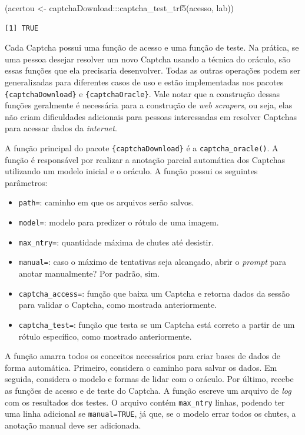 \documentclass[12pt,twoside,brazilian]{book}
\newenvironment{Shaded}{\begin{snugshade}}{\end{snugshade}}
\newcommand{\FunctionTok}[1]{\textcolor[rgb]{0.28,0.35,0.67}{#1}}
\newcommand{\NormalTok}[1]{\textcolor[rgb]{0.00,0.23,0.31}{#1}}
\newcommand{\OtherTok}[1]{\textcolor[rgb]{0.00,0.23,0.31}{#1}}
\newcommand{\SpecialCharTok}[1]{\textcolor[rgb]{0.37,0.37,0.37}{#1}}
\providecommand{\tightlist}{%
  \setlength{\itemsep}{0pt}\setlength{\parskip}{0pt}}
\begin{document}
\begin{Shaded}
\begin{Highlighting}[]
\NormalTok{(acertou }\OtherTok{\textless{}{-}}\NormalTok{ captchaDownload}\SpecialCharTok{:::}\FunctionTok{captcha\_test\_trf5}\NormalTok{(acesso, lab))}
\end{Highlighting}
\end{Shaded}

\begin{verbatim}
[1] TRUE
\end{verbatim}

Cada Captcha possui uma função de acesso e uma função de teste. Na
prática, se uma pessoa desejar resolver um novo Captcha usando a técnica
do oráculo, são essas funções que ela precisaria desenvolver. Todas as
outras operações podem ser generalizadas para diferentes casos de uso e
estão implementadas nos pacotes \texttt{\{captchaDownload\}} e
\texttt{\{captchaOracle\}}. Vale notar que a construção dessas funções
geralmente é necessária para a construção de \emph{web scrapers}, ou
seja, elas não criam dificuldades adicionais para pessoas interessadas
em resolver Captchas para acessar dados da \emph{internet}.

A função principal do pacote \texttt{\{captchaDownload\}} é a
\texttt{captcha\_oracle()}. A função é responsável por realizar a
anotação parcial automática dos Captchas utilizando um modelo inicial e
o oráculo. A função possui os seguintes parâmetros:

\begin{itemize}
\tightlist
\item
  \texttt{path=}: caminho em que os arquivos serão salvos.
\item
  \texttt{model=}: modelo para predizer o rótulo de uma imagem.
\item
  \texttt{max\_ntry=}: quantidade máxima de chutes até desistir.
\item
  \texttt{manual=}: caso o máximo de tentativas seja alcançado, abrir o
  \emph{prompt} para anotar manualmente? Por padrão, sim.
\item
  \texttt{captcha\_access=}: função que baixa um Captcha e retorna dados
  da sessão para validar o Captcha, como mostrada anteriormente.
\item
  \texttt{captcha\_test=}: função que testa se um Captcha está correto a
  partir de um rótulo específico, como mostrado anteriormente.
\end{itemize}

A função amarra todos os conceitos necessários para criar bases de dados
de forma automática. Primeiro, considera o caminho para salvar os dados.
Em seguida, considera o modelo e formas de lidar com o oráculo. Por
último, recebe as funções de acesso e de teste do Captcha. A função
escreve um arquivo de \emph{log} com os resultados dos testes. O arquivo
contém \texttt{max\_ntry} linhas, podendo ter uma linha adicional se
\texttt{manual=TRUE}, já que, se o modelo errar todos os chutes, a
anotação manual deve ser adicionada.
\end{document}
